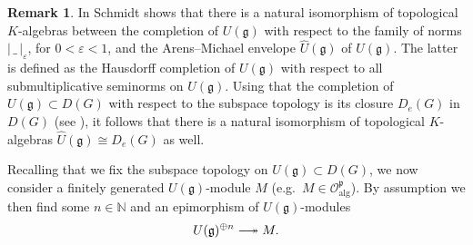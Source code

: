 \documentclass[a4paper, reqno, 10pt]{amsart}
\theoremstyle{definition}
\newtheorem{remark}[theorem]{Remark}
\numberwithin{equation}{section}
\newcommand{\abs}[1]{{\lvert{#1}\rvert}}
\newcommand{\blank}{{\,\_\,}}
\newcommand{\BN}{{\mathbb {N}}}
\newcommand{\CO}{{\mathcal {O}}}
\newcommand{\Fg}{{\mathfrak {g}}}
\newcommand{\Fp}{{\mathfrak {p}}}
\DeclareRobustCommand\longtwoheadrightarrow
{\relbar\joinrel\twoheadrightarrow}
\newcommand{\alg}{{\mathrm{alg}}}
\begin{document}
\begin{remark}\label{Rmk 3 - Isomorphism between distribution algebra of stalk and Arens-Michael envelope}
	In \cite[Thm.\ 2.1]{Schmidt10StabFlatNonArchHyperenvAlg} Schmidt shows that there is a natural isomorphism of topological $K$-algebras between the completion of $U(\Fg)$ with respect to the family of norms $\abs{\blank}_\varepsilon$, for $0<\varepsilon<1$, and the Arens--Michael envelope $\widehat{U}(\Fg)$ of $U(\Fg)$.
	The latter is defined as the Hausdorff completion of $U(\Fg)$ with respect to all submultiplicative seminorms on $U(\Fg)$.
	Using that the completion of $U(\Fg) \subset D(G)$ with respect to the subspace topology is its closure $D_e(G)$ in $D(G)$ (see ), it follows that there is a natural isomorphism of topological $K$-algebras $\widehat{U}(\Fg) \cong D_e(G)$ as well.
\end{remark}



Recalling that we fix the subspace topology on $U(\Fg)\subset D(G)$, we now consider a finitely generated $U(\Fg)$-module $M$ (e.g.\ $M \in \CO_\alg^\Fp$).
By assumption we then find some $n\in \BN$ and an epimorphism of $U(\Fg)$-modules
\begin{equation}\label{Eq 3 - Epimorphism onto finitely generated Lie algebra module}
	U(\Fg)^{\oplus n} \longtwoheadrightarrow M .
\end{equation}
\end{document}

